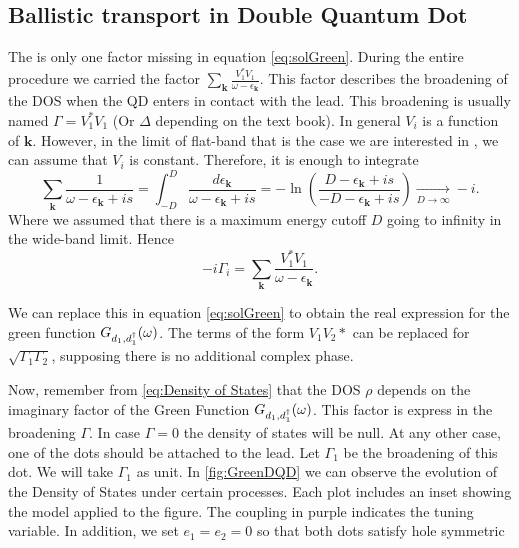 
\subsection{Ballistic transport in  Double Quantum Dot \label{sec:GreedDQD}}
The is only one factor missing in equation \eqref{eq:solGreen}. During the  entire procedure we carried the factor $\sum_{\boldsymbol{k}}\frac{V_{1}^{*}V_{1}}{\omega-\epsilon_{\boldsymbol{k}}}$. This factor describes the broadening of the DOS when the QD enters in contact with the lead. This broadening is usually named $\Gamma=V_{1}^{*}V_{1}$ (Or $\Delta$ depending on the text book). 
In general $V_i$  is a function of $\textbf{k}$. However, in the limit of flat-band that is the case we are interested in , we can assume that $V_i $ is constant. Therefore, it is enough to integrate
\begin{equation}
    \sum_{\boldsymbol{k}}\frac{1}{\omega-\epsilon_{\boldsymbol{k}}+is}=\int_{-D}^{D}\frac{d\epsilon_{\boldsymbol{k}}}{\omega-\epsilon_{\boldsymbol{k}}+is}=-\ln\left(\frac{D-\epsilon_{\boldsymbol{k}}+is}{-D-\epsilon_{\boldsymbol{k}}+is}\right)\xrightarrow[D\rightarrow\infty]{}-i.
\end{equation}
Where we assumed that there is a maximum  energy cutoff $D$ going to infinity in the wide-band limit. Hence 
\begin{equation}
   -i\Gamma_i = \sum_{\boldsymbol{k}}\frac{V_{1}^{*}V_{1}}{\omega-\epsilon_{\boldsymbol{k}}}.
\end{equation}

We can replace this in equation \eqref{eq:solGreen} to obtain the real expression for the green function $G_{d_1,d_1^\dagger}(\omega)$. The terms of the form $V_1V_2*$ can be replaced for $\sqrt{\Gamma_1\Gamma_2}$, supposing there is no additional complex phase.

Now, remember from \eqref{eq:Density of States} that the DOS $\rho$ depends on the imaginary factor of the Green Function $G_{d_1,d_1^\dagger}(\omega)$. This factor is express in the broadening $\Gamma$. In case $\Gamma = 0$ the density of states will be null. At any other case, one of the dots should be attached to the lead. Let $\Gamma_1$ be the broadening of this dot. We will take $\Gamma_1$ as unit.  
In \ref{fig:GreenDQD} we can observe the evolution of the Density of States under certain processes. Each plot includes an inset showing the model applied to the figure. The coupling in purple indicates the tuning variable. In addition, we set $e_1 = e_2 = 0$ so that both dots satisfy hole symmetric 


